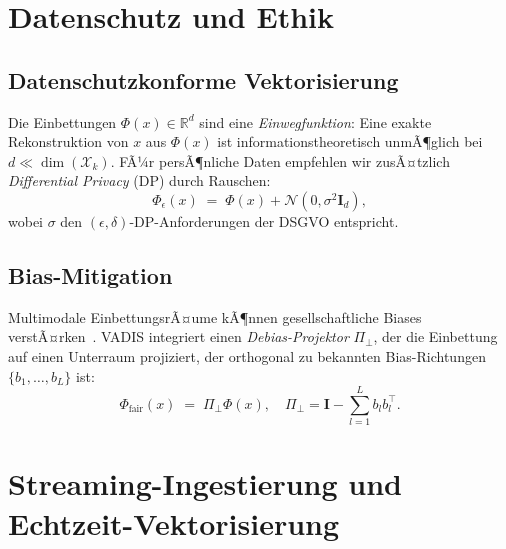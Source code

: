 ﻿\documentclass[12pt,a4paper]{article}
\begin{document}
\section{Datenschutz und Ethik}
\label{sec:ethik}

\subsection{Datenschutzkonforme Vektorisierung}

Die Einbettungen $\Phi(x) \in \mathbb{R}^d$ sind eine 
\emph{Einwegfunktion}: Eine exakte Rekonstruktion von $x$ aus 
$\Phi(x)$ ist informationstheoretisch unmÃ¶glich bei $d \ll \dim(\mathcal{X}_k)$.
FÃ¼r persÃ¶nliche Daten empfehlen wir zusÃ¤tzlich 
\emph{Differential Privacy} (DP) durch Rauschen:
\[
  \Phi_\epsilon(x) \;=\; \Phi(x) + \mathcal{N}(0, \sigma^2 \mathbf{I}_d),
\]
wobei $\sigma$ den $(\epsilon, \delta)$-DP-Anforderungen der DSGVO entspricht.

\subsection{Bias-Mitigation}

Multimodale EinbettungsrÃ¤ume kÃ¶nnen gesellschaftliche Biases 
verstÃ¤rken~\cite{bender2021stochastic}. VADIS integriert einen 
\emph{Debias-Projektor} $\Pi_{\perp}$, der die Einbettung auf 
einen Unterraum projiziert, der orthogonal zu bekannten 
Bias-Richtungen $\{b_1, \ldots, b_L\}$ ist:
\[
  \Phi_{\text{fair}}(x) \;=\; \Pi_{\perp} \Phi(x), \quad
  \Pi_{\perp} = \mathbf{I} - \sum_{l=1}^L b_l b_l^\top.
\]

\section{Streaming-Ingestierung und Echtzeit-Vektorisierung}
\label{sec:streaming}
\end{document}
